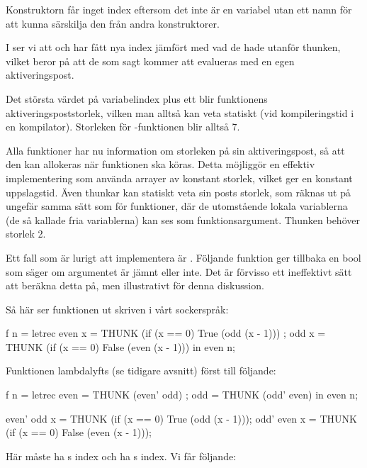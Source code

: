 \documentclass[../Core]{subfiles}
\begin{document}
Konstruktorn  får inget index eftersom det inte är en variabel
utan ett namn för att kunna särskilja den från andra konstruktorer. 

I  ser vi att 
 och  har fått nya index jämfört med vad de
hade utanför thunken, vilket beror på att de som sagt kommer att evalueras
med en egen aktiveringspost.

Det största värdet på variabelindex plus ett blir funktionens
aktiveringspoststorlek, vilken man alltså kan veta statiskt
(vid kompileringstid i en kompilator). Storleken för -funktionen blir alltså 7.

Alla funktioner har nu information om storleken på sin aktiveringspost, så att 
den kan allokeras när funktionen ska köras.
Detta möjliggör en effektiv implementering som använda arrayer av konstant 
storlek, vilket ger en konstant uppslagstid.
Även thunkar kan statiskt veta sin posts storlek,
som räknas ut på ungefär samma sätt som
för funktioner, där de utomstående lokala variablerna (de så kallade fria 
variablerna) kan ses som funktionsargument.
Thunken  behöver storlek 2.

Ett fall som är lurigt att implementera är .
Följande funktion  ger tillbaka en bool som säger om 
argumentet  är jämnt eller inte. Det är förvisso ett
ineffektivt sätt att beräkna detta på, men illustrativt för denna diskussion.

Så här ser funktionen ut skriven i vårt sockerspråk:

\begin{codeEx}
f n = letrec 
    { even x = THUNK (if (x == 0) True  (odd  (x - 1)))
    ; odd  x = THUNK (if (x == 0) False (even (x - 1)))
    } in even n;
\end{codeEx}

Funktionen lambdalyfts (se tidigare avsnitt) först till följande:

\begin{codeEx}
f n = letrec 
    { even = THUNK (even' odd)
    ; odd  = THUNK (odd' even)
    } in even n;
    
even' odd x = THUNK (if (x == 0) True  (odd  (x - 1)));
odd' even x = THUNK (if (x == 0) False (even (x - 1)));
\end{codeEx}

Här måste  ha s index och  ha s index. Vi får följande:
\end{document}
